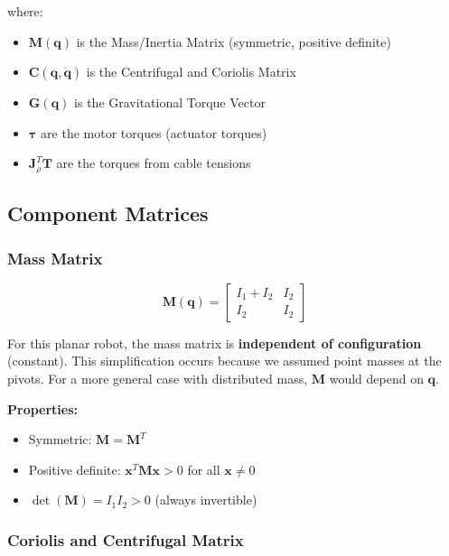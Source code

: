 where:

\begin{itemize}
    \item $\mathbf{M}(\mathbf{q})$ is the Mass/Inertia Matrix (symmetric, positive definite)
    \item $\mathbf{C}(\mathbf{q}, \dot{\mathbf{q}})$ is the Centrifugal and Coriolis Matrix
    \item $\mathbf{G}(\mathbf{q})$ is the Gravitational Torque Vector
    \item $\boldsymbol{\tau}$ are the motor torques (actuator torques)
    \item $\mathbf{J}_{\rho}^T \mathbf{T}$ are the torques from cable tensions
\end{itemize}

\subsection{Component Matrices}

\subsubsection{Mass Matrix}

\begin{equation}
\mathbf{M}(\mathbf{q}) = \begin{bmatrix}
I_1 + I_2 & I_2 \\
I_2 & I_2
\end{bmatrix}
\end{equation}

For this planar robot, the mass matrix is \textbf{independent of configuration} (constant). This simplification occurs because we assumed point masses at the pivots. For a more general case with distributed mass, $\mathbf{M}$ would depend on $\mathbf{q}$.

\textbf{Properties:}
\begin{itemize}
    \item Symmetric: $\mathbf{M} = \mathbf{M}^T$
    \item Positive definite: $\mathbf{x}^T \mathbf{M} \mathbf{x} > 0$ for all $\mathbf{x} \neq 0$
    \item $\det(\mathbf{M}) = I_1 I_2 > 0$ (always invertible)
\end{itemize}

\subsubsection{Coriolis and Centrifugal Matrix}

